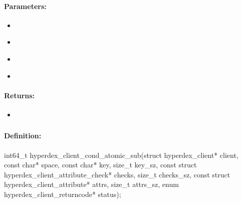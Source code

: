 \paragraph{Parameters:}
\begin{itemize}[noitemsep]
\item {}\\

\item {}\\

\item {}\\

\item {}\\

\end{itemize}

\paragraph{Returns:}
\begin{itemize}[noitemsep]
\item {}\\

\end{itemize}

\pagebreak
\subsubsection{}
\label{api:c:cond_atomic_sub}


\paragraph{Definition:}
\begin{ccode}
int64_t hyperdex_client_cond_atomic_sub(struct hyperdex_client* client,
        const char* space,
        const char* key, size_t key_sz,
        const struct hyperdex_client_attribute_check* checks, size_t checks_sz,
        const struct hyperdex_client_attribute* attrs, size_t attrs_sz,
        enum hyperdex_client_returncode* status);
\end{ccode}

